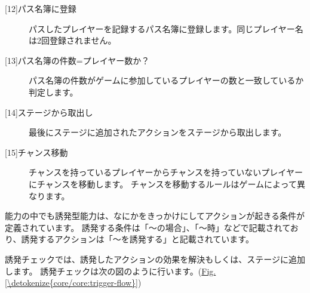 \documentclass[letterpaper,10pt,dvipdfmx]{sphinxmanual}
\begin{document}
\begin{description}
\item[{{[}12{]}パス名簿に登録}] \leavevmode
パスしたプレイヤーを記録するパス名簿に登録します。同じプレイヤー名は2回登録されません。

\item[{{[}13{]}パス名簿の件数=プレイヤー数か？}] \leavevmode
パス名簿の件数がゲームに参加しているプレイヤーの数と一致しているか判定します。

\item[{{[}14{]}ステージから取出し}] \leavevmode
最後にステージに追加されたアクションをステージから取出します。

\item[{{[}15{]}チャンス移動}] \leavevmode
チャンスを持っているプレイヤーからチャンスを持っていないプレイヤーにチャンスを移動します。
チャンスを移動するルールはゲームによって異なります。

\end{description}
\label{\detokenize{core/core:trigger-check}}
能力の中でも誘発型能力は、なにかをきっかけにしてアクションが起きる条件が定義されています。
誘発する条件は「〜の場合」、「〜時」などで記載されており、誘発するアクションは「〜を誘発する」と記載されています。

誘発チェックでは、誘発したアクションの効果を解決もしくは、ステージに追加します。
誘発チェックは次の図のように行います。(\hyperref[\detokenize{core/core:trigger-flow}]{Fig.\@ \ref{\detokenize{core/core:trigger-flow}}})
\end{document}
